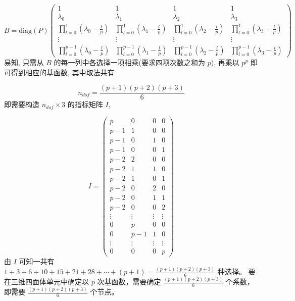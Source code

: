 \documentclass[12pt,a4paper]{article}
\begin{document}
$$
B = \mathrm{diag}(P)
\begin{pmatrix}
1 & 1 & 1 & 1\\
\lambda_0 & \lambda_1 & \lambda_2 & \lambda_3\\
\prod_{l=0}^{1}(\lambda_0 - \frac{l}{p}) & \prod_{l=0}^{1}(\lambda_1 - \frac{l}{p})
& \prod_{l=0}^{1}(\lambda_2 - \frac{l}{p}) & \prod_{l=0}^{1}(\lambda_3 - \frac{l}{p}) \\
\vdots & \vdots & \vdots & \vdots \\
\prod_{l=0}^{p-1}(\lambda_0 - \frac{l}{p}) & \prod_{l=0}^{p-1}(\lambda_1 - \frac{l}{p})
& \prod_{l=0}^{p-1}(\lambda_2 - \frac{l}{p}) & \prod_{l=0}^{p-1}(\lambda_3 - \frac{l}{p}) 
\end{pmatrix}
$$
易知, 只需从 $B$ 的每一列中各选择一项相乘(要求四项次数之和为 $p$), 再乘以 $p^p$ 即可得到相应的基函数, 其中取法共有 

$$
n_{dof} = \frac{(p+1)(p+2)(p+3)}{6}
$$
即需要构造 $n_{dof}\times 3$ 的指标矩阵 $I$, 

$$
I = \begin{pmatrix}
p & 0 & 0 & 0\\
p-1 & 1 & 0 & 0\\
p-1 & 0 & 1 & 0\\
p-1 & 0 & 0 & 1\\
p-2 & 2 & 0 & 0\\
p-2 & 1 & 1 & 0\\
p-2 & 1 & 0 & 1\\
p-2 & 0 & 2 & 0 \\
p-2 & 0 & 1 & 1 \\
p-2 & 0 & 0 & 2\\
\vdots & \vdots & \vdots & \vdots \\
0   & p & 0 & 0 \\
0   & p-1 & 1 & 0\\
\vdots & \vdots & \vdots & \vdots \\
0   & 0  & 0 & p 
\end{pmatrix}
$$
由 $I$ 可知一共有 $1+3+6+10+15+21+28+\cdots+(p+1)=\frac{(p+1)(p+2)(p+3)}{6}$ 种选择。
要在三维四面体单元中确定以 $p$ 次基函数，需要确定 $\frac{(p+1)(p+2)(p+3)}{6}$ 个系数，即需要 $\frac{(p+1)(p+2)(p+3)}{6}$ 个节点。















%
\end{document}
